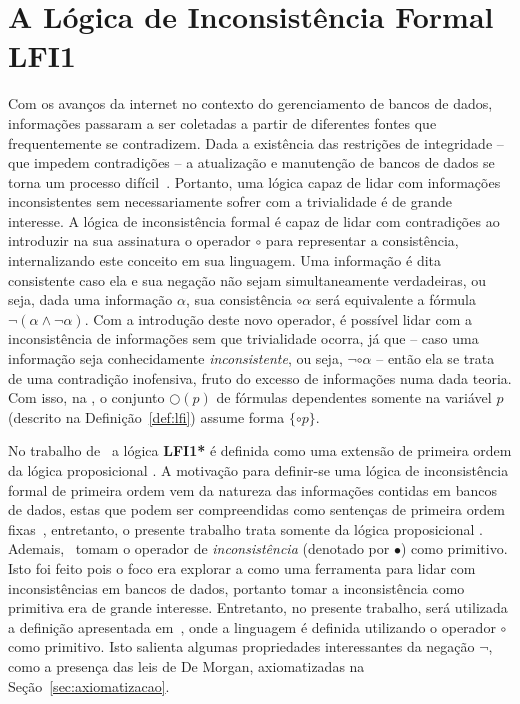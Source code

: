 \chapter{A Lógica de Inconsistência Formal LFI1}\label{cap:LFI1}

Com os avanços da internet no contexto do gerenciamento de bancos de dados, informações passaram a ser coletadas a partir de diferentes fontes que frequentemente se contradizem. Dada a existência das restrições de integridade {--} que impedem contradições {--} a atualização e manutenção de bancos de dados se torna um processo difícil~\cite{carnielli2000formal}. Portanto, uma lógica capaz de lidar com informações inconsistentes sem necessariamente sofrer com a trivialidade é de grande interesse. A lógica de inconsistência formal \lfium{} é capaz de lidar com contradições ao introduzir na sua assinatura o operador $\circ$ para representar a consistência, internalizando este conceito em sua linguagem. Uma informação é dita consistente caso ela e sua negação não sejam simultaneamente verdadeiras, ou seja, dada uma informação $\alpha$, sua consistência $\circ \alpha$ será equivalente a fórmula $\neg (\alpha \land \neg \alpha)$. Com a introdução deste novo operador, é possível lidar com a inconsistência de informações sem que trivialidade ocorra, já que {--} caso uma informação seja conhecidamente \textit{inconsistente}, ou seja, $\neg \circ \alpha$ {--} então ela se trata de uma contradição inofensiva, fruto do excesso de informações numa dada teoria. Com isso, na \lfium{}, o conjunto $\bigcirc(p)$ de fórmulas dependentes somente na variável $p$ (descrito na Definição~\ref{def:lfi}) assume forma $\{\circ p\}$.

No trabalho de~ a lógica \textbf{LFI1*} é definida como uma extensão de primeira ordem da lógica proposicional \lfium{}. A motivação para definir-se uma lógica de inconsistência formal de primeira ordem vem da natureza das informações contidas em bancos de dados, estas que podem ser compreendidas como sentenças de primeira ordem fixas~\cite{Codd}, entretanto, o presente trabalho trata somente da lógica proposicional \lfium{}. Ademais,~ tomam o operador de \textit{inconsistência} (denotado por $\bullet$) como primitivo. Isto foi feito pois o foco era explorar a \lfium{} como uma ferramenta para lidar com inconsistências em bancos de dados, portanto tomar a inconsistência como primitiva era de grande interesse. Entretanto, no presente trabalho, será utilizada a definição apresentada em~, onde a linguagem é definida utilizando o operador $\circ$ como primitivo. Isto salienta algumas propriedades interessantes da negação $\neg$, como a presença das leis de De Morgan, axiomatizadas na Seção~\ref{sec:axiomatizacao}.

